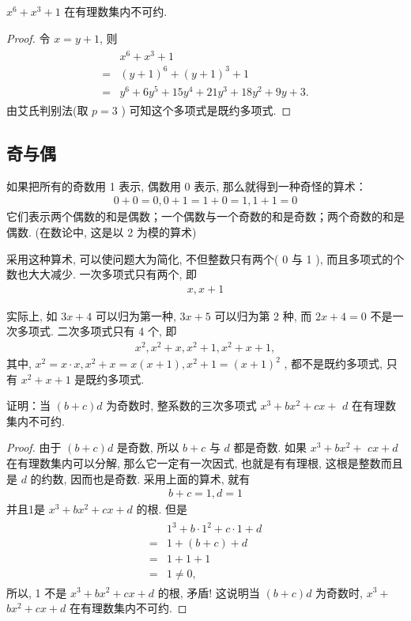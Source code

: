 \begin{example}
	$x^{6}+x^{3}+1$ 在有理数集内不可约.
\end{example}
\begin{proof}
	令 $x=y+1$, 则
	\begin{align*}
		\begin{aligned}
			  & x^{6}+x^{3}+1                                    \\
			= & (y+1)^{6}+(y+1)^{3}+1                            \\
			= & y^{6}+6 y^{5}+15 y^{4}+21 y^{3}+18 y^{2}+9 y+3 .
		\end{aligned}
	\end{align*}
	由艾氏判别法(取 $p=3$ ) 可知这个多项式是既约多项式.
\end{proof}

\subsection{奇与偶}
如果把所有的奇数用 1 表示, 偶数用 0 表示, 那么就得到一种奇怪的算术：
\begin{align*}
	0+0=0,0+1=1+0=1,1+1=0
\end{align*}
它们表示两个偶数的和是偶数；一个偶数与一个奇数的和是奇数；两个奇数的和是偶数. (在数论中, 这是以 2 为模的算术)

采用这种算术, 可以使问题大为简化, 不但整数只有两个( 0 与 1 ), 而且多项式的个数也大大减少. 一次多项式只有两个, 即
\begin{align*}
	x, x+1
\end{align*}

实际上, 如 $3 x+4$ 可以归为第一种,  $3 x+5$ 可以归为第 2 种, 而 $2 x+4=0$ 不是一次多项式. 二次多项式只有 4 个, 即
\begin{align*}
	x^{2}, x^{2}+x, x^{2}+1, x^{2}+x+1,
\end{align*}
其中,  $x^{2}=x \cdot x, x^{2}+x=x(x+1), x^{2}+1=(x+1)^{2}$ , 都不是既约多项式, 只有 $x^{2}+x+1$ 是既约多项式.

\begin{example}
	证明：当 $(b+c) d$ 为奇数时, 整系数的三次多项式 $x^{3}+b x^{2}+c x+$ $d$ 在有理数集内不可约.
\end{example}
\begin{proof}
	由于 $(b+c) d$ 是奇数, 所以 $b+c$ 与 $d$ 都是奇数. 如果 $x^{3}+b x^{2}+$ $c x+d$ 在有理数集内可以分解, 那么它一定有一次因式, 也就是有有理根, 这根是整数而且是 $d$ 的约数, 因而也是奇数. 采用上面的算术, 就有
	\begin{align*}
		b+c=1, d=1
	\end{align*}
	并且1是 $x^{3}+b x^{2}+c x+d$ 的根. 但是
	\begin{align*}
		\begin{aligned}
			  & 1^{3}+b \cdot 1^{2}+c \cdot 1+d \\
			= & 1+(b+c)+d                       \\
			= & 1+1+1                           \\
			= & 1 \neq 0,
		\end{aligned}
	\end{align*}
	所以,  1 不是 $x^{3}+b x^{2}+c x+d$ 的根, 矛盾! 这说明当 $(b+c) d$ 为奇数时,  $x^{3}+$ $b x^{2}+c x+d$ 在有理数集内不可约.
\end{proof}


